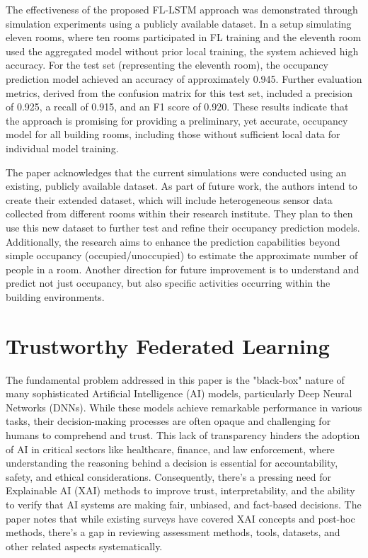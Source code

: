 The effectiveness of the proposed FL-LSTM approach was demonstrated through simulation experiments using a publicly available dataset. In a setup simulating eleven rooms, where ten rooms participated in FL training and the eleventh room used the aggregated model without prior local training, the system achieved high accuracy. For the test set (representing the eleventh room), the occupancy prediction model achieved an accuracy of approximately 0.945. Further evaluation metrics, derived from the confusion matrix for this test set, included a precision of 0.925, a recall of 0.915, and an F1 score of 0.920. These results indicate that the approach is promising for providing a preliminary, yet accurate, occupancy model for all building rooms, including those without sufficient local data for individual model training.

The paper acknowledges that the current simulations were conducted using an existing, publicly available dataset. As part of future work, the authors intend to create their extended dataset, which will include heterogeneous sensor data collected from different rooms within their research institute. They plan to then use this new dataset to further test and refine their occupancy prediction models. Additionally, the research aims to enhance the prediction capabilities beyond simple occupancy (occupied/unoccupied) to estimate the approximate number of people in a room. Another direction for future improvement is to understand and predict not just occupancy, but also specific activities occurring within the building environments.


\section{Trustworthy Federated Learning}

The fundamental problem addressed in this paper \cite{lo2022toward} is the "black-box" nature of many sophisticated Artificial Intelligence (AI) models, particularly Deep Neural Networks (DNNs). While these models achieve remarkable performance in various tasks, their decision-making processes are often opaque and challenging for humans to comprehend and trust. This lack of transparency hinders the adoption of AI in critical sectors like healthcare, finance, and law enforcement, where understanding the reasoning behind a decision is essential for accountability, safety, and ethical considerations. Consequently, there's a pressing need for Explainable AI (XAI) methods to improve trust, interpretability, and the ability to verify that AI systems are making fair, unbiased, and fact-based decisions. The paper notes that while existing surveys have covered XAI concepts and post-hoc methods, there's a gap in reviewing assessment methods, tools, datasets, and other related aspects systematically.

